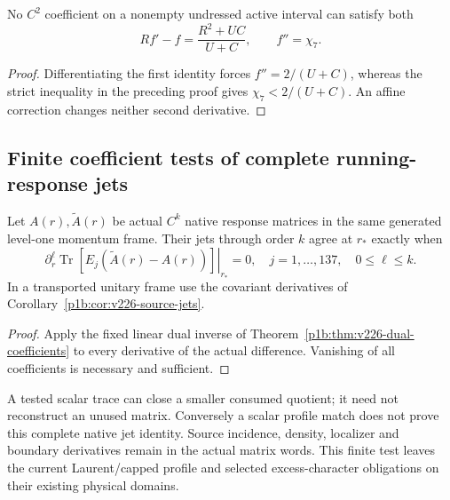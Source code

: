 \documentclass[12pt,a4paper]{article}
\begin{document}
\begin{corollary}
\label{p3d:cor:v2216-raw-euler-nongluing}
No $C^2$ coefficient on a nonempty undressed active interval can satisfy
both
\[
 Rf'-f=\frac{R^2+UC}{U+C},\qquad f''=\chi_7.
\]
\end{corollary}
\begin{proof}
Differentiating the first identity forces $f''=2/(U+C)$, whereas the
strict inequality in the preceding proof gives $\chi_7<2/(U+C)$.
An affine correction changes neither second derivative.
\end{proof}

\subsection{Finite coefficient tests of complete running-response jets}
\label{p3d:sec:v226-response-coefficients}
\begin{proposition}
\label{p3d:prop:v226-response-coefficients}
Let $A(r),\widetilde A(r)$ be actual $C^k$ native response matrices in the
same generated level-one momentum frame. Their jets through order $k$ agree at
$r_*$ exactly when
\[
 \left.\partial_r^\ell\operatorname{Tr}
       [E_j(\widetilde A(r)-A(r))]\right|_{r_*}=0,
 \quad j=1,\ldots,137,\quad 0\le\ell\le k.
\]
In a transported unitary frame use the covariant derivatives of
Corollary~\ref{p1b:cor:v226-source-jets}.
\end{proposition}
\begin{proof}
Apply the fixed linear dual inverse of
Theorem~\ref{p1b:thm:v226-dual-coefficients} to every derivative of the
actual difference. Vanishing of all coefficients is necessary and sufficient.
\end{proof}
A tested scalar trace can close a smaller consumed quotient; it need not
reconstruct an unused matrix. Conversely a scalar profile match does not
prove this complete native jet identity. Source incidence, density,
localizer and boundary derivatives remain in the actual matrix words.
This finite test leaves the current Laurent/capped profile and selected
excess-character obligations on their existing physical domains.
\end{document}
